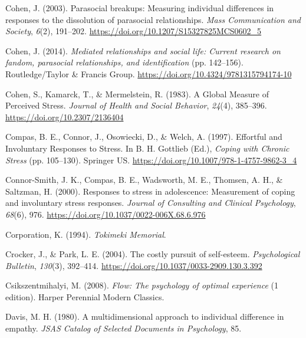 \documentclass[
]{udthesis}
\newlength{\cslhangindent}
\newenvironment{CSLReferences}[2] %
 {\begin{list}{}{%
  \setlength{\itemindent}{0pt}
  \setlength{\leftmargin}{0pt}
  \setlength{\parsep}{0pt}
  \ifodd #1
   \setlength{\leftmargin}{\cslhangindent}
   \setlength{\itemindent}{-1\cslhangindent}
  \fi
  \setlength{\itemsep}{#2\baselineskip}}}
 {\end{list}}
\begin{document}
\begin{CSLReferences}{1}{0}
Cohen, J. (2003). Parasocial breakups: Measuring individual differences in responses to the dissolution of parasocial relationships. \emph{Mass Communication and Society}, \emph{6}(2), 191--202. \url{https://doi.org/10.1207/S15327825MCS0602_5}

Cohen, J. (2014). \emph{Mediated relationships and social life: Current research on fandom, parasocial relationships, and identification} (pp. 142--156). Routledge/Taylor \& Francis Group. \url{https://doi.org/10.4324/9781315794174-10}

Cohen, S., Kamarck, T., \& Mermelstein, R. (1983). A {Global Measure} of {Perceived Stress}. \emph{Journal of Health and Social Behavior}, \emph{24}(4), 385--396. \url{https://doi.org/10.2307/2136404}

Compas, B. E., Connor, J., Osowiecki, D., \& Welch, A. (1997). Effortful and {Involuntary Responses} to {Stress}. In B. H. Gottlieb (Ed.), \emph{Coping with {Chronic Stress}} (pp. 105--130). {Springer US}. \url{https://doi.org/10.1007/978-1-4757-9862-3_4}

Connor-Smith, J. K., Compas, B. E., Wadsworth, M. E., Thomsen, A. H., \& Saltzman, H. (2000). Responses to stress in adolescence: {Measurement} of coping and involuntary stress responses. \emph{Journal of Consulting and Clinical Psychology}, \emph{68}(6), 976. \url{https://doi.org/10.1037/0022-006X.68.6.976}

Corporation, K. (1994). \emph{Tokimeki Memorial}.

Crocker, J., \& Park, L. E. (2004). The costly pursuit of self-esteem. \emph{Psychological Bulletin}, \emph{130}(3), 392--414. \url{https://doi.org/10.1037/0033-2909.130.3.392}

Csikszentmihalyi, M. (2008). \emph{Flow: The psychology of optimal experience} (1 edition). Harper Perennial Modern Classics.

Davis, M. H. (1980). A multidimensional approach to individual difference in empathy. \emph{{JSAS Catalog} of {Selected Documents} in {Psychology}}, 85.


\end{CSLReferences}
\end{document}
